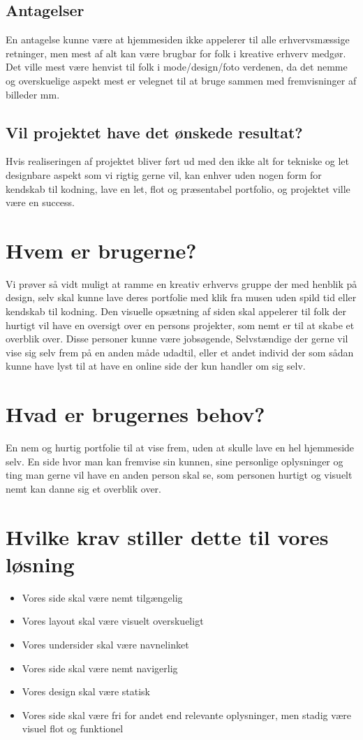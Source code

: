 \documentclass[a4paper,titlepage,fleqn,12pt]{article}
\begin{document}
\subsection{Antagelser}
En antagelse kunne være at hjemmesiden ikke appelerer til alle erhvervsmæssige retninger, men mest af alt kan være brugbar for folk i kreative erhverv medgør. Det ville mest være henvist til folk i mode/design/foto verdenen, da det nemme og overskuelige aspekt mest er velegnet til at bruge sammen med fremvisninger af billeder mm.

\subsection{Vil projektet have det ønskede resultat?}
Hvis realiseringen af projektet bliver ført ud med den ikke alt for tekniske og let designbare aspekt som vi rigtig gerne vil, kan enhver uden nogen form for kendskab til kodning, lave en let, flot og præsentabel portfolio, og projektet ville være en success.

\section{Hvem er brugerne?}
Vi prøver så vidt muligt at ramme en kreativ erhvervs gruppe der med henblik på design, selv skal kunne lave deres portfolie med klik fra musen uden spild tid eller kendskab til kodning. Den visuelle opsætning af siden skal appelerer til folk der hurtigt vil have en oversigt over en persons projekter, som nemt er til at skabe et overblik over. Disse personer kunne være jobsøgende, Selvstændige der gerne vil vise sig selv frem på en anden måde udadtil, eller et andet individ der som sådan kunne have lyst til at have en online side der kun handler om sig selv.

\section{Hvad er brugernes behov?}
En nem og hurtig portfolie til at vise frem, uden at skulle lave en hel hjemmeside selv. En side hvor man kan fremvise sin kunnen, sine personlige oplysninger og ting man gerne vil have en anden person skal se, som personen hurtigt og visuelt nemt kan danne sig et overblik over.

\section{Hvilke krav stiller dette til vores løsning}
\begin{itemize}
	\item Vores side skal være nemt tilgængelig
	\item Vores layout skal være visuelt overskueligt
	\item Vores undersider skal være navnelinket
	\item Vores side skal være nemt navigerlig
	\item Vores design skal være statisk
	\item Vores side skal være fri for andet end relevante oplysninger, men stadig være visuel flot og funktionel
\end{itemize}
\end{document}
